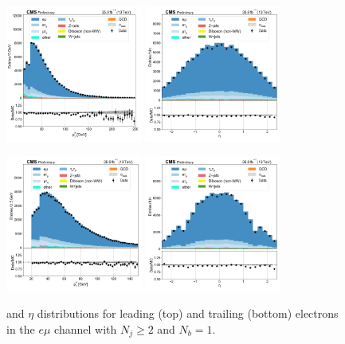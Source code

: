 \begin{figure}[htb!]
    \centering
    \includegraphics[width=0.4\textwidth]{chapters/Analysis/sectionPlots/figures/data_mc_overlays/emu_2016_cat_gt2_eq1_a_signal_linear_lepton_lepton1_pt}
    \includegraphics[width=0.4\textwidth]{chapters/Analysis/sectionPlots/figures/data_mc_overlays/emu_2016_cat_gt2_eq1_a_signal_linear_lepton_lepton1_eta}

    \includegraphics[width=0.4\textwidth]{chapters/Analysis/sectionPlots/figures/data_mc_overlays/emu_2016_cat_gt2_eq1_a_signal_linear_lepton_lepton2_pt}
    \includegraphics[width=0.4\textwidth]{chapters/Analysis/sectionPlots/figures/data_mc_overlays/emu_2016_cat_gt2_eq1_a_signal_linear_lepton_lepton2_eta}
    \caption{\pt and $\eta$ distributions for leading (top) and trailing
        (bottom) electrons in the $e\mu$ channel with $N_{j} \geq 2$ and
        $N_{b} = 1$.}
    \label{fig:analysis:plots:emu_5_kinematic}
\end{figure}

